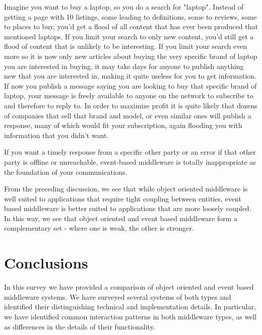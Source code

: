 \documentclass{acm_proc_article-sp}
\begin{document}
Imagine you want to buy a laptop, so you do a search for "laptop". Instead of getting a page with 10 listings, some leading to definitions, some to reviews, some to places to buy, you'd get a flood of all content that has ever been produced that mentioned laptops. If you limit your search to only new content, you'd still get a flood of content that is unlikely to be interesting. If you limit your search even more so it is now only new articles about buying the very specific brand of laptop you are interested in buying, it may take days for anyone to publish anything new that you are interested in, making it quite useless for you to get information. If now you publish a message saying you are looking to buy that specific brand of laptop, your message is freely available to anyone on the network to subscribe to and therefore to reply to. In order to maximize profit it is quite likely that dozens of companies that sell that brand and model, or even similar ones will publish a response, many of which would fit your subscription, again flooding you with information that you didn't want.

If you want a timely response from a specific other party or an error if that other party is offline or unreachable, event-based middleware is totally inappropriate as the foundation of your communications.

From the preceding discussion, we see that while object oriented middleware is well suited to applications that require tight coupling between entities, event based middleware is better suited to applications that are more loosely coupled. In this way, we see that object oriented and event based middleware form a complementary set - where one is weak, the other is stronger. 



\section{Conclusions}
\label{sec:conclusion}


In this survey we have provided a comparison of object oriented and event based middleware systems. We have surveyed several systems of both types and identified their distinguishing technical and implementation details. In particular, we have identified common interaction patterns in both middleware types, as well as differences in the details of their functionality. 
\end{document}
